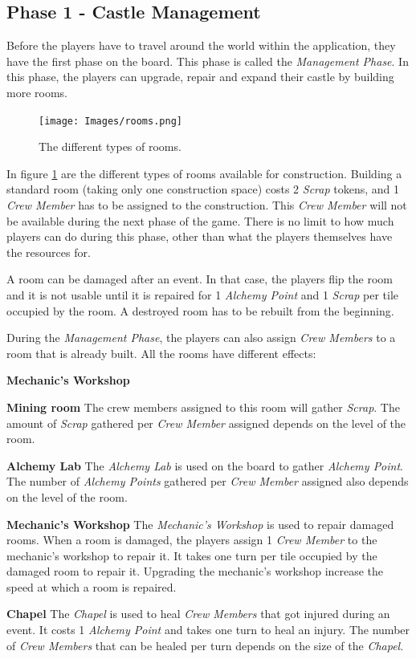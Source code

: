 \subsection{Phase 1 - Castle Management}
\label{sec:p1}
Before the players have to travel around the world within the application, they have the first phase on the board. This phase is called the \textit{Management Phase}. In this phase, the players can upgrade, repair and expand their castle by building more rooms.

\begin{figure}[!ht]
    \centering
    \texttt{[image: Images/rooms.png]}
    \caption{The different types of rooms.}
    \label{fig:roomtype}
\end{figure}

In figure \ref{fig:roomtype} are the different types of rooms available for construction. Building a standard room (taking only one construction space) costs 2 \textit{Scrap} tokens, and 1 \textit{Crew Member} has to be assigned to the construction. This \textit{Crew Member} will not be available during the next phase of the game.
There is no limit to how much players can do during this phase, other than what the players themselves have the resources for. 

A room can be damaged after an event. In that case, the players flip the room and it is not usable until it is repaired for 1 \textit{Alchemy Point} and 1 \textit{Scrap} per tile occupied by the room. A destroyed room has to be rebuilt from the beginning.


During the \textit{Management Phase}, the players can also assign \textit{Crew Members} to a room that is already built. All the rooms have different effects:
\begin{labeling}{\textbf{Mechanic's Workshop}}
\item[\textbf{Mining room}] The crew members assigned to this room will gather \textit{Scrap}. The amount of \textit{Scrap} gathered per \textit{Crew Member} assigned depends on the level of the room.
\item[\textbf{Alchemy Lab}] The \textit{Alchemy Lab} is used on the board to gather \textit{Alchemy Point}. The number of \textit{Alchemy Points} gathered per \textit{Crew Member} assigned also depends on the level of the room.
\item[\textbf{Mechanic's Workshop}] The \textit{Mechanic's Workshop} is used to repair damaged rooms. When a room is damaged, the players assign 1 \textit{Crew Member} to the mechanic's workshop to repair it. It takes one turn per tile occupied by the damaged room to repair it. Upgrading the mechanic's workshop increase the speed at which a room is repaired.
\item[\textbf{Chapel}] The \textit{Chapel} is used to heal \textit{Crew Members} that got injured during an event. It costs 1 \textit{Alchemy Point} and takes one turn to heal an injury. The number of \textit{Crew Members} that can be healed per turn depends on the size of the \textit{Chapel}.
\end{labeling}


